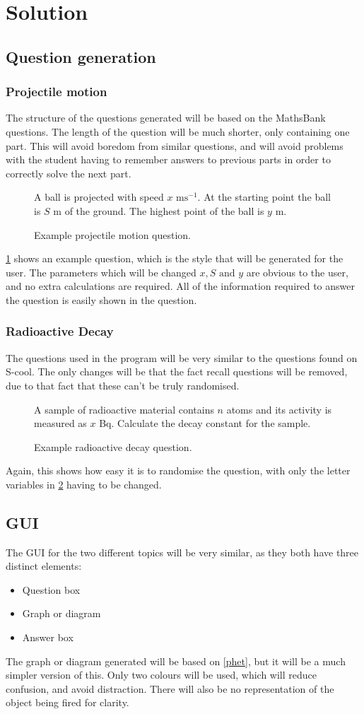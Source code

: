 \section{Solution}
\subsection{Question generation}
\subsubsection{Projectile motion}
The structure of the questions generated will be based on the MathsBank\autocite{mb} questions. The length of the question will be much shorter, only containing one part. This will avoid boredom from similar questions, and will avoid problems with the student having to remember answers to previous parts in order to correctly solve the next part. 
\begin{figure}
	\centering
	A ball is projected with speed \(x \text{ ms}^{-1}
	\). At the starting point the ball is \(S\) m of the ground. The highest point of the ball is \(y\)  m.
	\caption{Example projectile motion question.}
	\label{expm}
\end{figure}
\ref{expm} shows an example question, which is the style that will be generated for the user. The parameters which will be changed \(x, S \text{ and } y\) are obvious to the user, and no extra calculations are required. All of the information required to answer the question is easily shown in the question.
\subsubsection{Radioactive Decay}
The questions used in the program will be very similar to the questions found on S-cool\autocite{scool}. The only changes will be that the fact recall questions will be removed, due to that fact that these can't be truly randomised.
\begin{figure}[h]
	\centering
	A sample of radioactive material contains \(n\) atoms and its activity is measured as \(x\) Bq. Calculate the decay constant for the sample.
	\caption{Example radioactive decay question.}
	\label{exrd}
\end{figure}

Again, this shows how easy it is to randomise the question, with only the letter variables in \ref{exrd} having to be changed.

\subsection{GUI}
The GUI for the two different topics will be very similar, as they both have three distinct elements:	
\begin{itemize}
	\item{Question box}
	\item{Graph or diagram}
	\item{Answer box} 
\end{itemize}
The graph or diagram generated will be based on \ref{phet}, but it will be a much simpler version of this. Only two colours will be used, which will reduce confusion, and avoid distraction. There will also be no representation of the object being fired for clarity.
